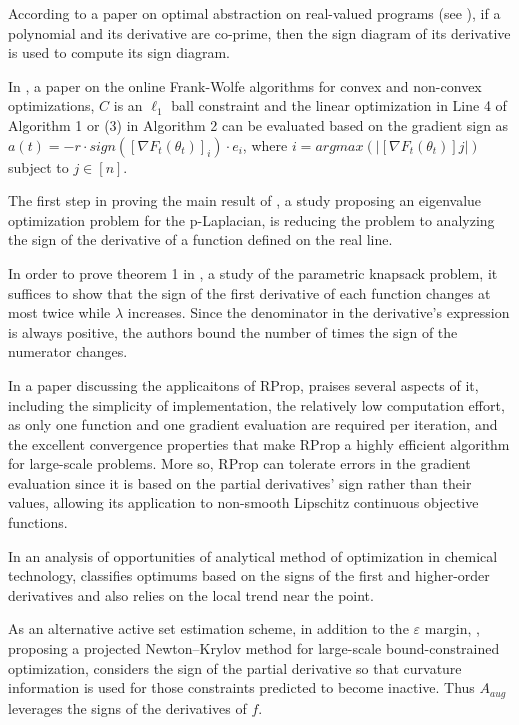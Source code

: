 \documentclass[11pt]{book}
\begin{document}
According to a paper on optimal abstraction on real-valued programs (see \cite{monniaux2007optimal}), if a polynomial and its derivative are co-prime, then the sign diagram
of its derivative is used to compute its sign diagram.

In \cite{lafond2015online}, a paper on the online Frank-Wolfe algorithms for
convex and non-convex optimizations, $C$ is an $\ell_{1}$ ball constraint and
the linear optimization in Line 4 of Algorithm 1 or (3) in Algorithm
2 can be evaluated based on the gradient sign as $a\left(t\right)=-r\cdot sign\left(\left[\nabla F_{t}(\theta_{t})\right]_{i}\right)\cdot e_{i}$,
where $i=argmax\left(\left|\left[\nabla F_{t}\left(\theta_{t}\right)\right]j\right|\right)$
subject to $j\in\left[n\right]$.

The first step in proving the main result of \cite{chorwadwala2015eigenvalue}, a study proposing an eigenvalue optimization problem
for the p-Laplacian,
is reducing the problem to analyzing the sign of the derivative of
a function defined on the real line.

In order to prove theorem 1 in \cite{holzhauser2017fptas}, a study of the parametric knapsack
problem, it suffices
to show that the sign of the first derivative of each function changes
at most twice while $\lambda$ increases. Since the denominator
in the derivative's expression is always positive, the authors bound
the number of times the sign of the numerator changes.

In a paper discussing the applicaitons of RProp, \cite{kotsialos2019constrained} praises several aspects of it, including
the simplicity of implementation, the relatively low computation effort,
as only one function and one gradient evaluation are required per
iteration, and the excellent convergence properties that make RProp a highly
efficient algorithm for large-scale problems. More so, RProp can tolerate errors
in the gradient evaluation since it is based on the partial derivatives'
sign rather than their values, allowing its application to non-smooth
Lipschitz continuous objective functions.

In an analysis of opportunities of analytical method
of optimization in chemical technology, \cite{prishchenko2020analysis} classifies optimums based on the signs
of the first and higher-order derivatives and also relies on the local
trend near the point.

As an alternative active set estimation scheme, in addition to the
$\varepsilon$ margin, \cite{kan2021pnkh}, proposing a projected Newton–Krylov
method for large-scale bound-constrained optimization, considers the sign of the
partial derivative so that curvature information is used for those
constraints predicted to become inactive. Thus $A_{aug}$ leverages
the signs of the derivatives of $f$.
\end{document}
